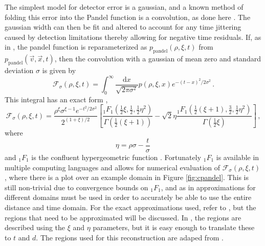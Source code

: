 The simplest model for detector error is a gaussian, and a known method of folding this error into the Pandel function is a convolution, as done here \cite{conv}. The gaussian width can then be fit and altered to account for any time jittering caused by detection limitations thereby allowing for negative time residuals. If, as in \cite{conv}, the pandel function is reparameterized as $p_{\text{pandel}}(\rho, \xi, t)$ from $p_{\text{pandel}}(\vec{v}, \vec{x}, t)$, then the convolution with a gaussian of mean zero and standard deviation $\sigma$ is given by
\begin{equation}
  \mathcal{F}_{\sigma}(\rho, \xi, t) = \int_{0}^{\infty}\frac{\text{d}x}{\sqrt{2\pi\sigma^{2}}}p(\rho, \xi, x)e^{-(t-x)^{2}/2\sigma^{2}}\, .
\end{equation}
This integral has an exact form \cite{conv},
\begin{equation}\label{eq:exact_cpandel}
  \mathcal{F}_{\sigma}(\rho, \xi, t) = \frac{\rho^{\xi}\sigma^{\xi-1}e^{-t^{2}/2\sigma^{2}}}{2^{(1+\xi)/2}}\left[\frac{_{1}F_{1}(\frac{1}{2}\xi,\frac{1}{2},\frac{1}{2}\eta^{2})}{\Gamma(\frac{1}{2}(\xi+1))} - \sqrt{2}\eta\frac{_{1}F_{1}(\frac{1}{2}(\xi+1),\frac{3}{2},\frac{1}{2}\eta^{2})}{\Gamma(\frac{1}{2}\xi)}\right]\, ,
\end{equation}
where
\begin{equation}
  \eta = \rho\sigma - \frac{t}{\sigma}\, 
\end{equation}
and $_{1}F_{1}$ is the confluent hypergeometric function \cite{conv}. Fortunately $_{1}F_{1}$ is available in multiple computing languages and allows for numerical evaluation of $\mathcal{F}_{\sigma}(\rho, \xi, t)$ \cite{conv}, where there is a plot over an example domain in Figure \ref{fig:cpandel}. This is still non-trivial due to convergence bounds on $_{1}F_{1}$, and as in \cite{conv} approximations for different domains must be used in order to accurately be able to use the entire distance and time domain. For the exact approximations used, refer to \cite{conv}, but the regions that need to be approximated will be discussed. In \cite{conv}, the regions are described using the $\xi$ and $\eta$ parameters, but it is easy enough to translate these to $t$ and $d$. The regions used for this reconstruction are adaped from \cite{conv}.


